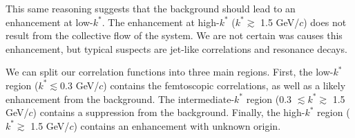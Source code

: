\documentclass[../AnalysisNoteJBuxton.tex]{subfiles}
\begin{document}
This same reasoning suggests that the background should lead to an enhancement at low-$k^{*}$.  The enhancement at high-$k^{*}$ ($k^{*} \gtrsim$ 1.5 GeV/$c$) does not result from the collective flow of the system.  We are not certain was causes this enhancement, but typical suspects are jet-like correlations and resonance decays.

We can split our correlation functions into three main regions.  First, the low-$k^{*}$ region ($k^{*} \lesssim 0.3$ GeV/$c$) contains the femtoscopic correlations, as well as a likely enhancement from the background.  The intermediate-$k^{*}$ region (0.3 $\lesssim k^{*} \gtrsim$ 1.5 GeV/$c$) contains a suppression from the background.  Finally, the high-$k^{*}$ region ($k^{*} \gtrsim$ 1.5 GeV/$c$) contains an enhancement with unknown origin.


\begin{figure}[h!]
  \centering

\end{figure}
\end{document}
